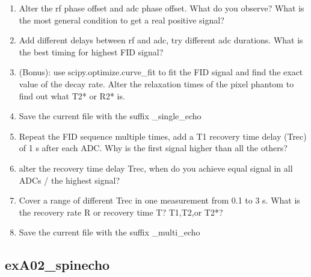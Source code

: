 \documentclass[a4paper,12pt]{extarticle}
\begin{document}
\begin{enumerate}
\item  Alter the rf phase offset and adc phase offset. What do you observe? What is the most general condition to get a real positive signal?
		
\item  Add different delays between rf and adc, try different adc durations. What is the best timing for highest FID signal?

\item  (Bonus): use scipy.optimize.curve\_fit to fit the FID signal and find the exact value of the decay rate. Alter the relaxation times of the pixel phantom to find out what T2* or R2* is.

\item Save the current file with the suffix \_single\_echo
	
\item  	Repeat the FID sequence multiple times, add a T1 recovery time delay (Trec) of 1 s after each ADC. Why is the first signal higher than all the others?

\item 	alter the recovery time delay Trec, when do you achieve equal signal in all ADCs / the highest signal?

\item	Cover a range of different Trec in one measurement from 0.1 to 3 s. What is the recovery rate R or recovery time T? T1,T2,or T2*?  

\item Save the current file with the suffix \_multi\_echo

\end{enumerate}

\newpage
\subsection{exA02\_spinecho}
\end{document}

